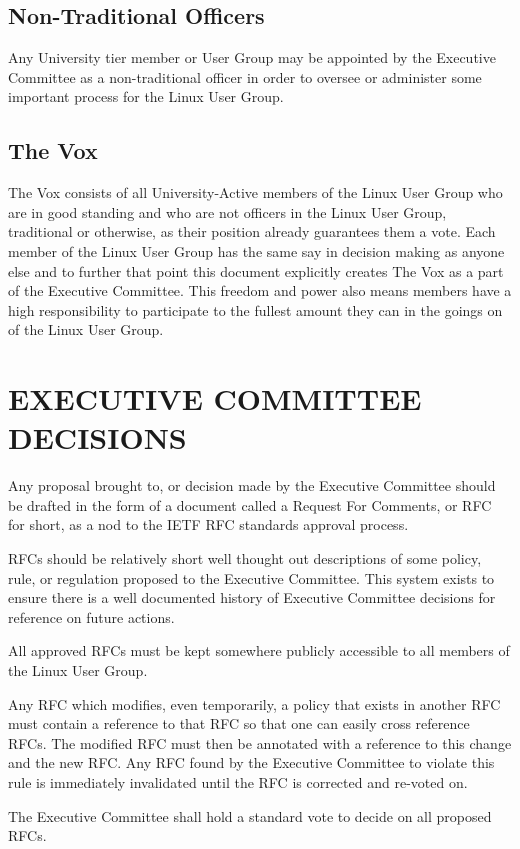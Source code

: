 \documentclass[letter]{report}
\begin{document}
\section{Non-Traditional Officers}
Any University tier member or User Group may be appointed by the Executive
Committee as a non-traditional officer in order to oversee or administer some
important process for the Linux User Group.

\section{The Vox}
The Vox consists of all University-Active members of the Linux User Group who
are in good standing and who are not officers in the Linux User Group,
traditional or otherwise, as their position already guarantees them a vote. Each
member of the Linux User Group has the same say in decision making as anyone
else and to further that point this document explicitly creates The Vox as a
part of the Executive Committee. This freedom and power also means members have
a high responsibility to participate to the fullest amount they can in the
goings on of the Linux User Group.


\chapter{EXECUTIVE COMMITTEE DECISIONS}
Any proposal brought to, or decision made by the Executive Committee should be
drafted in the form of a document called a Request For Comments, or RFC for
short, as a nod to the IETF RFC standards approval process.

RFCs should be relatively short well thought out descriptions of some policy,
rule, or regulation proposed to the Executive Committee. This system exists to
ensure there is a well documented history of Executive Committee decisions for
reference on future actions.

All approved RFCs must be kept somewhere publicly accessible to all members of
the Linux User Group.

Any RFC which modifies, even temporarily, a policy that exists in another RFC
must contain a reference to that RFC so that one can easily cross reference
RFCs. The modified RFC must then be annotated with a reference to this change
and the new RFC. Any RFC found by the Executive Committee to violate this rule
is immediately invalidated until the RFC is corrected and re-voted on.

The Executive Committee shall hold a standard vote to decide on all proposed
RFCs.
\end{document}
